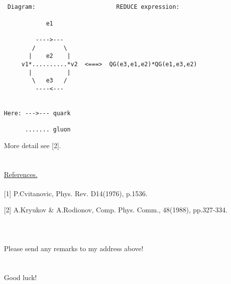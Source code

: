 \begin{verbatim}


 Diagram:                       REDUCE expression:

            e1

         ---->---
        /        \
       |    e2    |
     v1*..........*v2  <===>  QG(e3,e1,e2)*QG(e1,e3,e2)
       |          |
        \   e3   /
         ----<---


Here: --->--- quark

      ....... gluon

\end{verbatim}

More detail see {[}2{]}. \\
\ \\
\ \\
\underline{References.} \\ 
\ \\
{[}1{]} P.Cvitanovic, Phys. Rev. D14(1976), p.1536.

{[}2{]} A.Kryukov \& A.Rodionov, Comp. Phys. Comm., 48(1988), pp.327-334.\\
\ \\
\ \\
\ \\
Please send any remarks to my address above! \\
\ \\
\ \\
Good luck!
